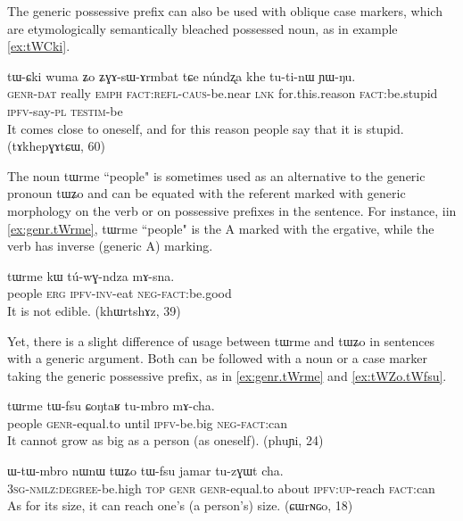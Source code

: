 \documentclass[oldfontcommands,oneside,a4paper,11pt]{article}
\newcommand{\ipa}[1]{{\phon \mbox{#1}}} %
\begin{document}
The generic possessive prefix can also be used with oblique case markers, which are etymologically semantically bleached possessed noun, as in example \ref{ex:tWCki}.

\begin{exe}
\ex  \label{ex:tWCki}
\gll
\ipa{tɯ-ɕki} 	\ipa{wuma} 	\ipa{ʑo} 	\ipa{ʑɣɤ-sɯ-ɤrmbat} 	\ipa{tɕe} 	\ipa{núndʐa} 	\ipa{khe} 	\ipa{tu-ti-nɯ} 	\ipa{ɲɯ-ŋu.} \\
\textsc{genr-dat} really \textsc{emph} \textsc{fact:refl-caus}-be.near \textsc{lnk} for.this.reason \textsc{fact}:be.stupid \textsc{ipfv}-say-\textsc{pl} \textsc{testim}-be \\
\glt It comes close to oneself, and for this reason people say that it is stupid. (tɤkhepɣɤtɕɯ, 60)
\end{exe}

The noun \ipa{tɯrme} ``people" is sometimes used as an alternative to the generic pronoun \ipa{tɯʑo} and can be equated with the referent marked with generic morphology on the verb or on possessive prefixes in the sentence. For instance, iin \ref{ex:genr.tWrme}, \ipa{tɯrme} ``people" is the A marked with the ergative, while the verb has inverse (generic A) marking.


\begin{exe}
\ex  \label{ex:genr.tWrme}
\gll
\ipa{tɯrme} 	\ipa{kɯ} 	\ipa{tú-wɣ-ndza} 	\ipa{mɤ-sna.} \\
people \textsc{erg} \textsc{ipfv-inv}-eat \textsc{neg-fact}:be.good \\
\glt It is not edible. (khɯrtshɤz, 39)
\end{exe}

Yet, there is a slight difference of usage between \ipa{tɯrme} and \ipa{tɯʑo} in sentences with a generic argument. Both can be followed with a noun or a case marker taking the generic possessive prefix, as in \ref{ex:genr.tWrme} and \ref{ex:tWZo.tWfsu}. 

\begin{exe}
\ex  \label{ex:genr.tWrme}
\gll
\ipa{tɯrme} 	\ipa{tɯ-fsu} 	\ipa{ɕoŋtaʁ} 	\ipa{tu-mbro} 	\ipa{mɤ-cha.} \\
people \textsc{genr}-equal.to until \textsc{ipfv}-be.big \textsc{neg-fact}:can \\ 
\glt It cannot grow as big as a person (as oneself). (phuɲi, 24)
\end{exe}

\begin{exe}
\ex  \label{ex:tWZo.tWfsu}
\gll
\ipa{ɯ-tɯ-mbro} 	\ipa{nɯnɯ} 	\ipa{tɯʑo} 	\ipa{tɯ-fsu} 	\ipa{jamar} 	\ipa{tu-zɣɯt} 	\ipa{cha.}  \\
\textsc{3sg-nmlz:degree}-be.high \textsc{top} \textsc{genr} \textsc{genr}-equal.to about \textsc{ipfv:up}-reach \textsc{fact}:can \\
\glt As for its size, it can reach one's (a person's) size. (ɕɯrɴɢo, 18)
\end{exe}
\end{document}
